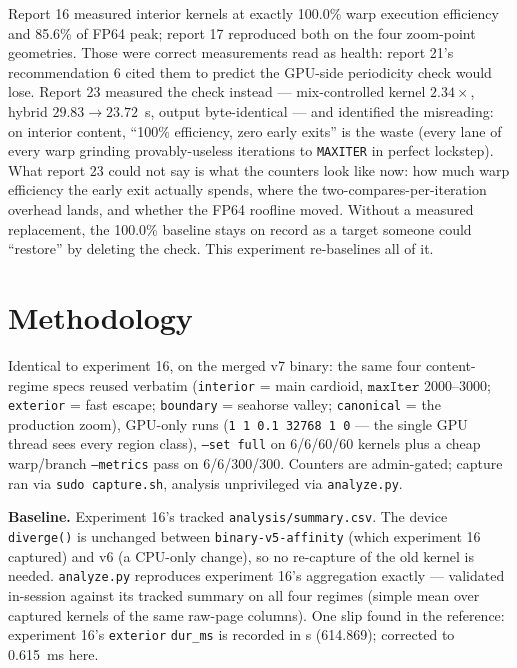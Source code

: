 \documentclass[
	english,
	letterpaper, oneside
]{article}
\begin{document}
Report 16 measured interior kernels at exactly 100.0\% warp execution
efficiency and 85.6\% of FP64 peak; report 17 reproduced both on the four
zoom-point geometries. Those were correct measurements read as health:
report 21's recommendation 6 cited them to predict the GPU-side
periodicity check would lose. Report 23 measured the check instead ---
mix-controlled kernel $2.34\times$, hybrid $29.83 \to 23.72$~s, output
byte-identical --- and identified the misreading: on interior content,
``100\% efficiency, zero early exits'' is the waste (every lane of
every warp grinding provably-useless iterations to \texttt{MAXITER} in
perfect lockstep). What report 23 could not say is what the counters look
like now: how much warp efficiency the early exit actually spends, where
the two-compares-per-iteration overhead lands, and whether the FP64
roofline moved. Without a measured replacement, the 100.0\% baseline
stays on record as a target someone could ``restore'' by deleting the
check. This experiment re-baselines all of it.

\section{Methodology}
\label{sec:method}

Identical to experiment 16, on the merged v7 binary: the same four
content-regime specs reused verbatim (\texttt{interior} = main cardioid,
$\texttt{maxIter}$ 2000--3000; \texttt{exterior} = fast escape;
\texttt{boundary} = seahorse valley; \texttt{canonical} = the production
zoom), GPU-only runs (\texttt{1 1 0.1 32768 1 0} --- the single GPU thread
sees every region class), \texttt{--set full} on 6/6/60/60 kernels plus a
cheap warp/branch \texttt{--metrics} pass on 6/6/300/300. Counters are
admin-gated; capture ran via \texttt{sudo capture.sh}, analysis
unprivileged via \texttt{analyze.py}.

\textbf{Baseline.} Experiment 16's tracked \texttt{analysis/summary.csv}.
The device \texttt{diverge()} is unchanged between \texttt{binary-v5-affinity}
(which experiment 16 captured) and v6 (a CPU-only change), so no
re-capture of the old kernel is needed. \texttt{analyze.py} reproduces
experiment 16's aggregation exactly --- validated in-session against its
tracked summary on all four regimes (simple mean over captured kernels of
the same raw-page columns). One slip found in the reference: experiment
16's \texttt{exterior} \texttt{dur\_ms} is recorded in \textmu s (614.869);
corrected to 0.615~ms here.
\end{document}
